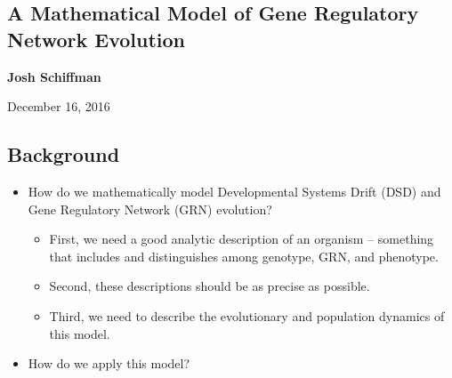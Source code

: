 \documentclass{seminar}
\begin{document}
\begin{slide}
  \centering
  \section*{A Mathematical Model of Gene Regulatory Network Evolution}
  
  \textbf{Josh Schiffman}
  
  December 16, 2016
\end{slide}
  \begin{slide}
    \section*{Background}
    \begin{itemize}
      \item How do we mathematically model Developmental Systems Drift (DSD) and Gene Regulatory Network (GRN) evolution?
        \begin{itemize}
          \item First, we need a good analytic description of an organism -- something that includes and distinguishes among genotype, GRN, and phenotype. 
          \item Second, these descriptions should be as precise as possible. 
          \item Third, we need to describe the evolutionary and population dynamics of this model.
        \end{itemize}
      \item How do we apply this model?
    \end{itemize}
  \end{slide}
\end{document}
